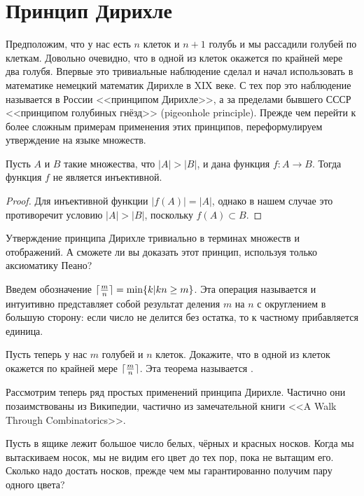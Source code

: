 \section{Принцип Дирихле}

Предположим, что у нас есть $n$ клеток и $n+1$ голубь и мы рассадили голубей по клеткам. Довольно очевидно, что в одной из клеток окажется по крайней мере два голубя. Впервые это тривиальные наблюдение сделал и начал использовать в математике немецкий математик Дирихле в XIX веке. С тех пор это наблюдение называется в России <<принципом Дирихле>>, а за пределами бывшего СССР <<принципом голубиных гнёзд>> (pigeonhole principle). Прежде чем перейти к более сложным примерам применения этих принципов, переформулируем утверждение на языке множеств.

\begin{thm}
Пусть $A$ и $B$ такие множества, что $|A|>|B|$, и дана функция $f:A\to B$. Тогда функция $f$ не является инъективной.
\end{thm}
\begin{proof}
Для инъективной функции $|f(A)| = |A|$, однако в нашем случае это противоречит условию $|A|>|B|$, поскольку $f(A)\subset B$.
\end{proof}

\begin{exercise}
Утверждение принципа Дирихле тривиально в терминах множеств и отображений. А сможете ли вы доказать этот принцип, используя только аксиоматику Пеано?
\end{exercise}

Введем обозначение $\lceil {m\over n} \rceil = \min\{k|kn\ge m\}$. Эта операция называется  и интуитивно представляет собой результат деления $m$ на $n$ с округлением в большую сторону: если число не делится без остатка, то к частному прибавляется единица.

\begin{exercise}
Пусть теперь у нас $m$ голубей и $n$ клеток. Докажите, что в одной из клеток окажется по крайней мере $\lceil{m\over n}\rceil$. Эта теорема называется .
\end{exercise}

Рассмотрим теперь ряд простых применений принципа Дирихле. Частично они позаимствованы из Википедии, частично из замечательной книги <<A Walk Through Combinatorics>>.

\begin{example}
Пусть в ящике лежит большое число белых, чёрных и красных носков. Когда мы вытаскиваем носок, мы не видим его цвет до тех пор, пока не вытащим его. Сколько надо достать носков, прежде чем мы гарантированно получим пару одного цвета?
\end{example}

